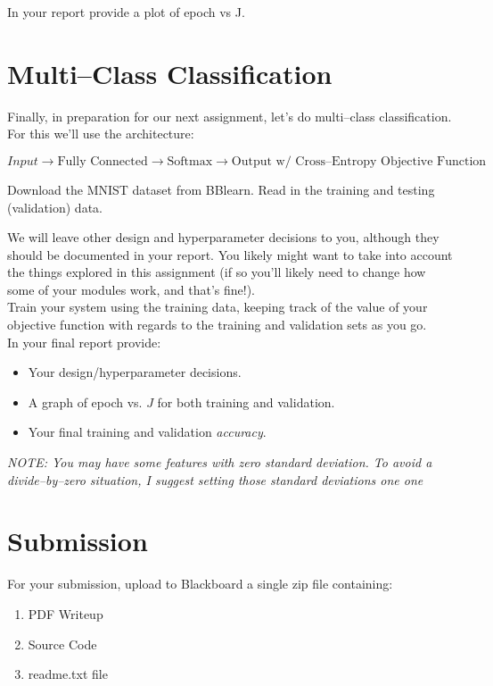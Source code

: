 \documentclass[12pt]{article}
\begin{document}
\noindent
In your report provide a plot of epoch vs J.

\newpage
\section{Multi--Class Classification}
Finally, in preparation for our next assignment, let's do multi--class classification.  For this we'll use the architecture:

$$Input \rightarrow \textrm{Fully Connected} \rightarrow \textrm{Softmax} \rightarrow \textrm{Output w/ Cross--Entropy Objective Function}$$

\noindent
Download the MNIST dataset from BBlearn.  Read in the training and testing (validation) data.

\noindent
We will leave other design and hyperparameter decisions to you, although they should be documented in your report.  You likely might want to take into account the things explored in this assignment (if so you'll likely need to change how some of your modules work, and that's fine!).\\

\noindent
Train your system using the training data, keeping track of the value of your objective function with regards to the training and validation sets as you go.\\

\noindent
In your final report provide:
\begin{itemize}
\item Your design/hyperparameter decisions.
\item A graph of epoch vs. $J$ for both training and validation.
\item Your final training and validation \emph{accuracy}.
\end{itemize}

\noindent
\emph{NOTE: You may have some features with zero standard deviation.  To avoid a divide--by--zero situation, I suggest setting those standard deviations one one}

\newpage
\section*{Submission}
For your submission, upload to Blackboard a single zip file containing:

\begin{enumerate}
\item PDF Writeup
\item Source Code
\item readme.txt file
\end{enumerate}
\end{document}

